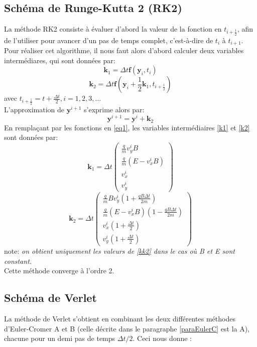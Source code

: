 \documentclass[a4paper,12pt,oneside]{article}
\def \be {\begin{equation}}
\def \ee {\end{equation}}
\begin{document}
\subsection{Schéma de Runge-Kutta 2 (RK2) \cite{notesDeCours}}
 La méthode RK2 consiste à évaluer d'abord la valeur de la fonction en $t_{i+\frac{1}{2}}$, afin de l'utiliser pour avancer d'un pas de temps complet, c'est-à-dire de $t_i$ à $t_{i+1}$. Pour réaliser cet algorithme, il nous faut alors d'abord calculer deux variables intermédiares, qui sont données par:
\be
\textbf{k}_1=\Delta t\textbf{f}(\textbf{y}_i,t_i)\label{k1}
\ee
\be
\textbf{k}_2=\Delta t\textbf{f}(\textbf{y}_i+\frac{1}{2}\textbf{k}_1,t_{i+
\frac{1}{2}})\label{k2}
\ee
avec $t_{i+\frac{1}{2}}=t + \frac{\Delta t}{2},i=1,2,3,...$ \\
L'approximation de $\textbf{y}^{i+1}$ s'exprime alors par:
\be
\textbf{y}^{i+1}= \textbf{y}^{i}+\textbf{k}_2
\ee
 En remplaçant par les fonctions en \eqref{eq1}, les variables intermédiaires \eqref{k1} et \eqref{k2}  sont données par:
\be
\textbf{k}_1=\Delta t \left( \begin{array}{c}
   \frac{q}{m} v_y^{i} B\\ \frac{q}{m} (E-v_x^{i} B) \\ 
   v_x^{i} \\ v_y^{i}
\end{array} \right)
\ee
\be
\textbf{k}_2=\Delta t  \left( \begin{array}{c}
   \frac{q}{m}B v_y^{i}(1+\frac{qB\Delta t}{2m}) \\ \frac{q}{m} (E-v_x^{i} B)(1-\frac{qB\Delta t}{2m}) \\ 
   v_x^{i}(1+\frac{\Delta t}{2}) \\ v_y^{i}(1+\frac{\Delta t}{2})
\end{array} \right)\label{kk2}
\ee
note: \textit{on obtient  uniquement les valeurs de \eqref{kk2} dans le cas où B et E sont constant.}\\
Cette méthode converge à l'ordre 2.

\subsection{Schéma de Verlet \cite{notesDeCours}}
La méthode de Verlet s'obtient en combinant les deux différentes méthodes d'Euler-Cromer A et B (celle décrite dans le paragraphe \ref{paraEulerC} est la A), chacune pour un demi pas de temps $\Delta t /2$. Ceci nous donne :
\end{document}
